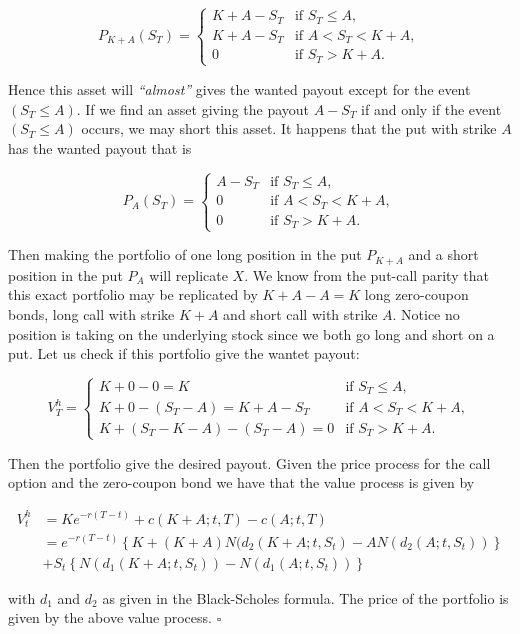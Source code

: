 \documentclass[
]{article}
\begin{document}
\[
P_{K+A}(S_T)=
\begin{cases}
  K+A-S_T & \text{if }S_T\le A,\\
  K+A-S_T & \text{if }A<S_T<K+ A,\\
  0 & \text{if }S_T > K+ A.
\end{cases}
\]

Hence this asset will \emph{``almost''} gives the wanted payout except
for the event \((S_T\le A)\). If we find an asset giving the payout
\(A-S_T\) if and only if the event \((S_T\le A)\) occurs, we may short
this asset. It happens that the put with strike \(A\) has the wanted
payout that is

\[
P_{A}(S_T)=
\begin{cases}
  A-S_T & \text{if }S_T\le A,\\
  0 & \text{if }A<S_T<K+ A,\\
  0 & \text{if }S_T > K+ A.
\end{cases}
\]

Then making the portfolio of one long position in the put \(P_{K+A}\)
and a short position in the put \(P_A\) will replicate \(X\). We know
from the put-call parity that this exact portfolio may be replicated by
\(K+A-A=K\) long zero-coupon bonds, long call with strike \(K+A\) and
short call with strike \(A\). Notice no position is taking on the
underlying stock since we both go long and short on a put. Let us check
if this portfolio give the wantet payout:

\[
V^h_T=
\begin{cases}
  K +0-0 = K & \text{if }S_T\le A,\\
  K + 0 - (S_T-A)=K+A-S_T & \text{if }A<S_T<K+ A,\\
  K + (S_T-K-A)-(S_T-A)=0 & \text{if }S_T > K+ A.
\end{cases}
\]

Then the portfolio give the desired payout. Given the price process for
the call option and the zero-coupon bond we have that the value process
is given by

\begin{align*}
V_t^h&=Ke^{-r(T-t)}+c(K+A;t,T)-c(A;t,T)\\
&=e^{-r(T-t)}\left\{K+(K+A)N(d_2(K+A;t,S_t)-AN(d_2(A;t,S_t))\right\}\\
&+S_t\left\{N(d_1(K+A;t,S_t))-N(d_1(A;t,S_t))\right\}
\end{align*}

with \(d_1\) and \(d_2\) as given in the Black-Scholes formula. The
price of the portfolio is given by the above value process. \(\square\)
\end{document}

